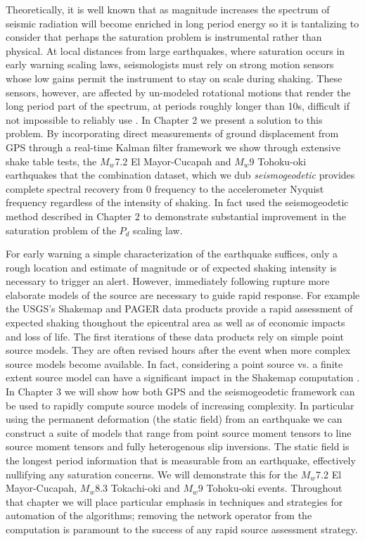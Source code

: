 Theoretically, it is well known that as magnitude increases the spectrum of seismic radiation will become enriched in long period energy \citep{haskell1964,brune1970} so it is tantalizing to consider that perhaps the saturation problem is instrumental rather than physical. At local distances from large earthquakes, where saturation occurs in early warning scaling laws, seismologists must rely on strong motion sensors whose low gains permit the instrument to stay on scale during shaking. These sensors, however, are affected by un-modeled rotational motions \citep{Trifunac2001} that render the long period part of the spectrum, at periods roughly longer than 10s, difficult if not impossible to reliably use \citep{Boore2005}. In Chapter 2 we present a solution to this problem. By incorporating direct measurements of ground displacement from GPS through a real-time Kalman filter framework we show through extensive shake table tests, the $M_w$7.2 El Mayor-Cucapah and $M_w$9 Tohoku-oki earthquakes that the combination dataset, which we dub \textit{seismogeodetic} provides complete spectral recovery from 0 frequency to the accelerometer Nyquist frequency regardless of the intensity of shaking. In fact \citep{Crowell2013} used the seismogeodetic method described in Chapter 2 to demonstrate substantial improvement in the saturation problem of the $P_d$ scaling law.

For early warning a simple characterization of the earthquake suffices, only a rough location and estimate of magnitude or of expected shaking intensity is necessary to trigger an alert. However, immediately following rupture more elaborate models of the source are necessary to guide rapid response. For example the USGS's Shakemap \citep{allen2009shake} and PAGER \citep{jaiswal2010} data products provide a rapid assessment of expected shaking thoughout the epicentral area as well as of economic impacts and loss of life. The first iterations of these data products rely on simple point source models. They are often revised hours after the event when more complex source models become available. In fact, considering a point source vs. a finite extent source model can have a significant impact in the Shakemap computation \citep{colombelli2013}. In Chapter 3 we will show how both GPS and the seismogeodetic framework can be used to rapidly compute source models of increasing complexity. In particular using the permanent deformation (the static field) from an earthquake we can construct a suite of models that range from point source moment tensors to line source moment tensors and fully heterogenous slip inversions. The static field is the longest period information that is measurable from an earthquake, effectively nullifying any saturation concerns.  We will demonstrate this for the $M_w$7.2 El Mayor-Cucapah, $M_w$8.3 Tokachi-oki and $M_w$9 Tohoku-oki events. Throughout that chapter we will place particular emphasis in techniques and strategies for automation of the algorithms; removing the network operator from the computation is paramount to the success of any rapid source assessment strategy.

